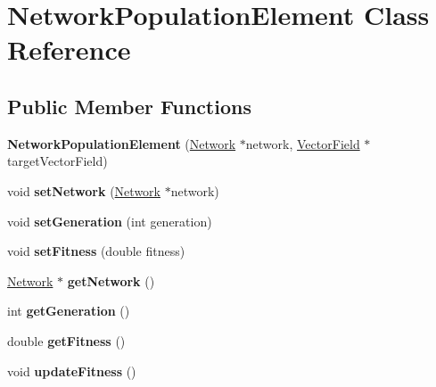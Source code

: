 \hypertarget{classNetworkPopulationElement}{}\section{Network\+Population\+Element Class Reference}
\label{classNetworkPopulationElement}
\subsection*{Public Member Functions}
\begin{DoxyCompactItemize}
\item 
{\bfseries Network\+Population\+Element} (\hyperlink{classNetwork}{Network} $\ast$network, \hyperlink{classVectorField}{Vector\+Field} $\ast$target\+Vector\+Field)\hypertarget{classNetworkPopulationElement_aeed7d30a346b055a95dd1827fb2df1fb}{}\label{classNetworkPopulationElement_aeed7d30a346b055a95dd1827fb2df1fb}

\item 
void {\bfseries set\+Network} (\hyperlink{classNetwork}{Network} $\ast$network)\hypertarget{classNetworkPopulationElement_ab83a20e81daa8cf9c8dbc2f2d9f7e6d1}{}\label{classNetworkPopulationElement_ab83a20e81daa8cf9c8dbc2f2d9f7e6d1}

\item 
void {\bfseries set\+Generation} (int generation)\hypertarget{classNetworkPopulationElement_afb53613da5e6eeaf282a8aee0300177d}{}\label{classNetworkPopulationElement_afb53613da5e6eeaf282a8aee0300177d}

\item 
void {\bfseries set\+Fitness} (double fitness)\hypertarget{classNetworkPopulationElement_acda942cd45d2cb5ba6cb66736d2307d5}{}\label{classNetworkPopulationElement_acda942cd45d2cb5ba6cb66736d2307d5}

\item 
\hyperlink{classNetwork}{Network} $\ast$ {\bfseries get\+Network} ()\hypertarget{classNetworkPopulationElement_ab2ac6422dd7de65c411908188137de19}{}\label{classNetworkPopulationElement_ab2ac6422dd7de65c411908188137de19}

\item 
int {\bfseries get\+Generation} ()\hypertarget{classNetworkPopulationElement_abefb39c34b027b388b54f5a87fff046d}{}\label{classNetworkPopulationElement_abefb39c34b027b388b54f5a87fff046d}

\item 
double {\bfseries get\+Fitness} ()\hypertarget{classNetworkPopulationElement_a9a87c74424584b3cd00df6e62f34bbd0}{}\label{classNetworkPopulationElement_a9a87c74424584b3cd00df6e62f34bbd0}

\item 
void {\bfseries update\+Fitness} ()\hypertarget{classNetworkPopulationElement_a292d501aaee880c515cfed645e478c37}{}\label{classNetworkPopulationElement_a292d501aaee880c515cfed645e478c37}

\end{DoxyCompactItemize}


